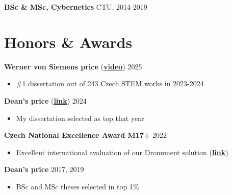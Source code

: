 \documentclass[12pt,a4paper]{article}
\newcommand\Colorhref[3][ref]{\href{#2}{\color{#1}#3}}
\begin{document}
\begin{paracol}{2}
\vspace{0.2cm}
\noindent
\textbf{BSc \& MSc, Cybernetics} \hfill CTU, 2014-2019

\section*{Honors \& Awards}
\textbf{Werner von Siemens price} (\Colorhref{https://www.youtube.com/watch?v=idnDA4Ap-J4}{\textbf{video}}) \hfill 2025
\begin{itemize}
  \item \#1 dissertation out of 243 Czech STEM works in 2023-2024
\end{itemize}

\vspace{0.2cm}
\noindent
\textbf{Dean's price} (\Colorhref{https://cyber.felk.cvut.cz/news/pavel-petracek-received-the-deans-award-for-prestigious-dissertation/}{\textbf{link}}) \hfill 2024
\begin{itemize}
  \item My dissertation selected as top that year
\end{itemize}

\vspace{0.2cm}
\noindent
\textbf{Czech National Excellence Award M17+} \hfill 2022
\begin{itemize}
  \item Excellent international evaluation of our Dronument solution (\Colorhref{https://mrs.fel.cvut.cz/dg18p02ovv069-fvz}{\textbf{link}})
\end{itemize}

\vspace{0.2cm}
\noindent
\textbf{Dean's price} \hfill 2017, 2019
\begin{itemize}
  \item BSc and MSc theses selected in top 1\%
\end{itemize}

\end{paracol}
\end{document}

